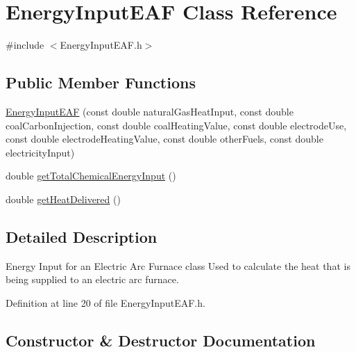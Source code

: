 \hypertarget{class_energy_input_e_a_f}{}\section{Energy\+Input\+E\+AF Class Reference}
\label{class_energy_input_e_a_f}


{\ttfamily \#include $<$Energy\+Input\+E\+A\+F.\+h$>$}

\subsection*{Public Member Functions}
\begin{DoxyCompactItemize}
\item 
\hyperlink{class_energy_input_e_a_f_a385f7047f5019124d7559cdbcb229a04}{Energy\+Input\+E\+AF} (const double natural\+Gas\+Heat\+Input, const double coal\+Carbon\+Injection, const double coal\+Heating\+Value, const double electrode\+Use, const double electrode\+Heating\+Value, const double other\+Fuels, const double electricity\+Input)
\item 
double \hyperlink{class_energy_input_e_a_f_a44b4a70dcc3e5f0bf9d33eabd6158b2f}{get\+Total\+Chemical\+Energy\+Input} ()
\item 
double \hyperlink{class_energy_input_e_a_f_ad1916eba02c6036a603cf34420169911}{get\+Heat\+Delivered} ()
\end{DoxyCompactItemize}


\subsection{Detailed Description}
Energy Input for an Electric Arc Furnace class Used to calculate the heat that is being supplied to an electric arc furnace. 

Definition at line 20 of file Energy\+Input\+E\+A\+F.\+h.



\subsection{Constructor \& Destructor Documentation}
\mbox{\label{class_energy_input_e_a_f_a385f7047f5019124d7559cdbcb229a04}} 
